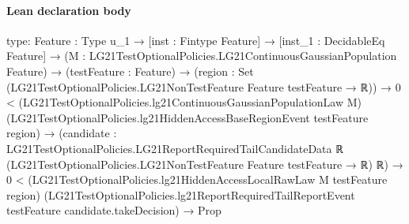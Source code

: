 \documentclass[10pt]{article}
\begin{document}
\paragraph{Lean declaration body}
\begin{ReviewVerbatim}
type:
{Feature : Type u_1} →
  [inst : Fintype Feature] →
    [inst_1 : DecidableEq Feature] →
      (M : LG21TestOptionalPolicies.LG21ContinuousGaussianPopulation Feature) →
        (testFeature : Feature) →
          (region : Set (LG21TestOptionalPolicies.LG21NonTestFeature Feature testFeature → ℝ)) →
            0 <
                (LG21TestOptionalPolicies.lg21ContinuousGaussianPopulationLaw M)
                  (LG21TestOptionalPolicies.lg21HiddenAccessBaseRegionEvent testFeature region) →
              (candidate :
                  LG21TestOptionalPolicies.LG21ReportRequiredTailCandidateData ℝ
                    (LG21TestOptionalPolicies.LG21NonTestFeature Feature testFeature → ℝ) ℝ) →
                0 <
                    (LG21TestOptionalPolicies.lg21HiddenAccessLocalRawLaw M testFeature region)
                      (LG21TestOptionalPolicies.lg21ReportRequiredTailReportEvent testFeature candidate.takeDecision) →
                  Prop


\end{ReviewVerbatim}
\end{document}
